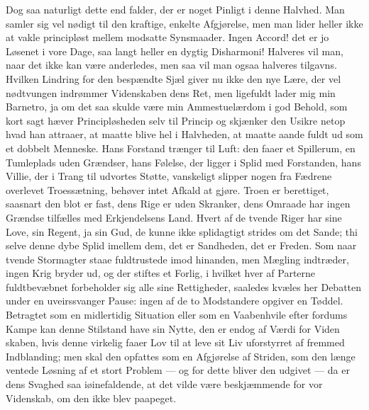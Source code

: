 Dog saa naturligt dette end falder, der er noget Pinligt i denne Halvhed.
Man samler sig vel nødigt til den kraftige, enkelte Afgjørelse, men man lider
heller ikke at vakle principløst mellem modsatte Synsmaader. Ingen Accord!
det er jo Løsenet i vore Dage, saa langt heller en dygtig Disharmoni!
Halveres vil man, naar det ikke kan være anderledes, men saa
vil man ogsaa halveres tilgavns. Hvilken Lindring for den
bespændte Sjæl giver nu ikke den nye Lære, der vel nødtvungen indrømmer
Videnskaben dens Ret, men ligefuldt lader mig min Barnetro, ja om det saa
skulde være min Ammestuelærdom i god Behold, som kort sagt hæver
Principløsheden selv til Princip og skjænker den Usikre netop hvad han
attraaer, at maatte blive hel i Halvheden, at maatte aande fuldt ud som et
dobbelt Menneske. Hans Forstand trænger til Luft: den faaer et Spillerum, en
Tumleplads uden Grændser, hans Følelse, der ligger i Splid med Forstanden,
hans Villie, der i Trang til udvortes Støtte, vanskeligt slipper nogen fra
Fædrene overlevet Troessætning, behøver intet Afkald at gjøre. Troen er
berettiget, saasnart den blot er fast, dens Rige er uden Skranker, dens
Omraade har ingen Grændse tilfælles med Erkjendelsens Land. Hvert af de
tvende Riger har sine Love, sin Regent, ja sin Gud, de kunne ikke splidagtigt
strides om det Sande; thi selve denne dybe Splid imellem dem, det er
Sandheden, det er Freden. Som naar tvende Stormagter staae fuldtrustede imod
hinanden, men Mægling indtræder, ingen Krig bryder ud, og der stiftes et
Forlig, i hvilket hver af Parterne fuldtbevæbnet forbeholder sig alle sine
Rettigheder, saaledes kvæles her Debatten under en uveirssvanger Pause: ingen
af de to Modstandere opgiver en Tøddel. Betragtet som en midlertidig
Situation eller som en Vaabenhvile efter fordums Kampe kan denne Stilstand
have sin Nytte, den er endog af Værdi for Viden%
skaben, hvis denne virkelig faaer Lov til at leve sit Liv
uforstyrret af fremmed Indblanding; men skal den opfattes som en Afgjørelse
af Striden, som den længe ventede Løsning af et stort Problem --- og for
dette bliver den udgivet --- da er dens Svaghed saa iøinefaldende, at det vilde være
beskjæmmende for vor Videnskab, om den ikke blev paapeget.

